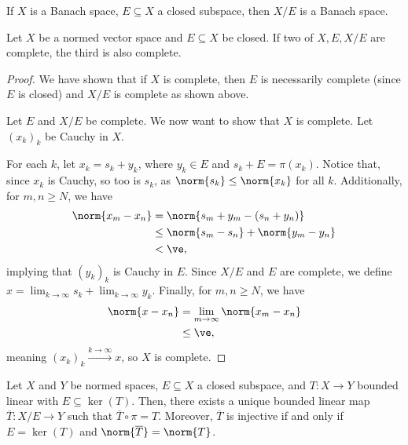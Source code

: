 \documentclass[10pt]{mypackage}
\begin{document}
\begin{corollary}
  If $X$ is a Banach space, $E\subseteq X$ a closed subspace, then $X/E$ is a Banach space.
\end{corollary}
\begin{corollary}
  Let $X$ be a normed vector space and $E\subseteq X$ be closed. If two of $X,E,X/E$ are complete, the third is also complete.
\end{corollary}
\begin{proof}
  We have shown that if $X$ is complete, then $E$ is necessarily complete (since $E$ is closed) and $X/E$ is complete as shown above.\newline

  Let $E$ and $X/E$ be complete. We now want to show that $X$ is complete. Let $\left(x_k\right)_k$ be Cauchy in $X$.\newline

  For each $k$, let $x_k = s_k + y_k$, where $y_k\in E$ and $s_k + E = \pi\left(x_k\right)$. Notice that, since $x_k$ is Cauchy, so too is $s_k$, as $\norm{s_k} \leq \norm{x_k}$ for all $k$. Additionally, for $m,n \geq N$, we have
  \begin{align*}
    \norm{x_{m} - x_{n}} &= \norm{s_m + y_m - \left(s_n + y_n\right)}\\
                         &\leq \norm{s_m - s_n} + \norm{y_m - y_n}\\
                         &< \ve,
  \end{align*}
  implying that $\left(y_k\right)_k$ is Cauchy in $E$. Since $X/E$ and $E$ are complete, we define $x = \lim_{k\rightarrow\infty}s_k + \lim_{k\rightarrow\infty}y_k$. Finally, for $m,n\geq N$, we have
  \begin{align*}
    \norm{x - x_n} &= \lim_{m\rightarrow\infty}\norm{x_m - x_n}\\
                   &\leq \ve,
  \end{align*}
  meaning $\left(x_k\right)_k \xrightarrow{k\rightarrow\infty} x$, so $X$ is complete.
\end{proof}
\begin{proposition}
  Let $X$ and $Y$ be normed spaces, $E\subseteq X$ a closed subspace, and $T: X\rightarrow Y$ bounded linear with $E\subseteq \ker(T)$. Then, there exists a unique bounded linear map $\overline{T}: X/E\rightarrow Y$ such that $\overline{T}\circ \pi = T$. Moreover, $\overline{T}$ is injective if and only if $E = \ker(T)$ and $\norm{\overline{T}}=\norm{T}$.
\end{proposition}
\end{document}
